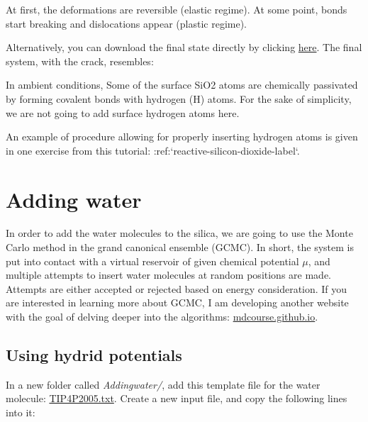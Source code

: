 At first, the deformations
are reversible (elastic regime). At some point, bonds
start breaking and dislocations appear (plastic regime). 

Alternatively, you
can download the final state directly by clicking
\href{../../../../../inputs/level3/water-adsorption-in-silica/Cracking/dilatedSiO.data}{here}. The final system, with the crack, resembles:

\begin{tcolorbox}[colback=mylightblue!5!white,colframe=mylightblue!75!black,title=Passivated silica]
In ambient conditions, Some of the surface SiO2 atoms are chemically
passivated by forming covalent bonds with hydrogen (H)
atoms. For the sake of simplicity, we are not going to
add surface hydrogen atoms here. 

An example of procedure allowing for properly inserting hydrogen atoms is given in one 
exercise from this tutorial: :ref:`reactive-silicon-dioxide-label`.
\end{tcolorbox}

\noindent \section{Adding water}

\begin{tcolorbox}[colback=mylightblue!5!white,colframe=mylightblue!75!black,title=About the GCMC method]
In order to add the water molecules to the silica, we are
going to use the Monte Carlo method in the grand canonical
ensemble (GCMC). In short, the system is put into contact
with a virtual reservoir of given chemical potential
$\mu$, and multiple attempts to insert water
molecules at random positions are made. Attempts are
either accepted or rejected based on energy consideration.
If you are interested in learning more about GCMC, I am developing
another website with the goal of delving deeper into the algorithms: \href{https://mdcourse.github.io}{mdcourse.github.io}.
\end{tcolorbox}

\noindent \subsection{Using hydrid potentials}

In a new folder called \textit{Addingwater/}, add this template file
for the water molecule: \href{../../../../../inputs/level3/water-adsorption-in-silica/AddingWater/TIP4P2005.txt}{TIP4P2005.txt}.
Create a new input file, and copy the following lines into it:

